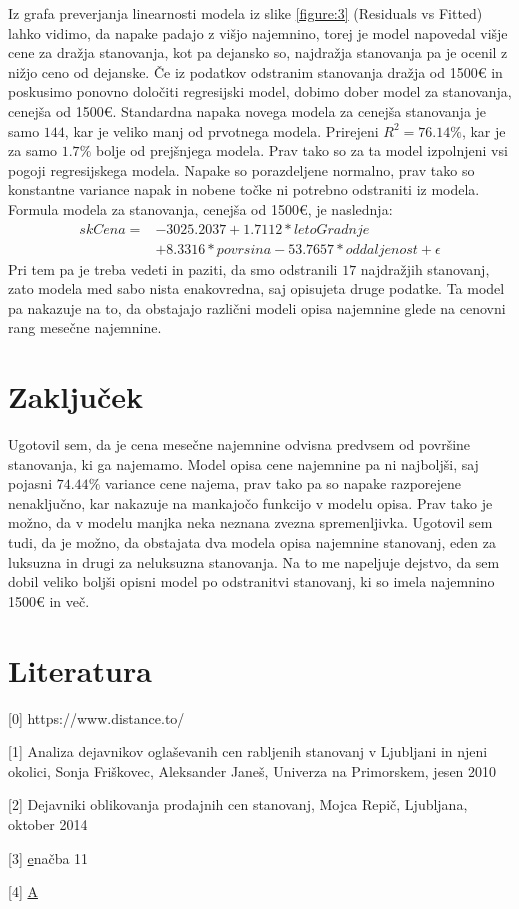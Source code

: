 \documentclass[a4paper, 12pt]{article}
\begin{document}
Iz grafa preverjanja linearnosti modela iz slike \ref{figure:3}
(Residuals vs Fitted) lahko vidimo, da napake padajo z višjo najemnino, torej
je model napovedal višje cene za dražja stanovanja, kot pa dejansko so,
najdražja stanovanja pa je ocenil z nižjo ceno od dejanske. Če iz podatkov
odstranim stanovanja dražja od 1500€ in poskusimo ponovno določiti regresijski
model, dobimo dober model za stanovanja, cenejša od 1500€. Standardna napaka
novega modela za cenejša stanovanja je samo $ 144 $, kar je veliko manj od
prvotnega modela. Prirejeni $ R^{2} = 76.14\% $, kar je za samo $ 1.7\% $ bolje
od prejšnjega modela. Prav tako so za ta model izpolnjeni vsi pogoji
regresijskega modela. Napake so porazdeljene normalno, prav tako so konstantne
variance napak in nobene točke ni potrebno odstraniti iz modela. Formula modela
za stanovanja, cenejša od 1500€, je naslednja:
\begin{equation}
\begin{split}
	skCena = &-3025.2037+1.7112*letoGradnje \\
			&+8.3316*povrsina-53.7657*oddaljenost+\epsilon
\end{split}
\end{equation}
Pri tem pa je treba vedeti in paziti, da smo odstranili $ 17 $ najdražjih
stanovanj, zato modela med sabo nista enakovredna, saj opisujeta druge
podatke. Ta model pa nakazuje na to, da obstajajo različni modeli opisa
najemnine glede na cenovni rang mesečne najemnine.

\section{Zaključek}

Ugotovil sem, da je cena mesečne najemnine odvisna predvsem od površine
stanovanja, ki ga najemamo. Model opisa cene najemnine pa ni najboljši, saj
pojasni $ 74.44\% $ variance cene najema, prav tako pa so napake razporejene
nenaključno, kar nakazuje na mankajočo funkcijo v modelu opisa. Prav tako je
možno, da v modelu manjka neka neznana zvezna spremenljivka. Ugotovil sem tudi,
da je možno, da obstajata dva modela opisa najemnine stanovanj, eden za
luksuzna in drugi za neluksuzna stanovanja. Na to me napeljuje dejstvo, da sem
dobil veliko boljši opisni model po odstranitvi stanovanj, ki so imela
najemnino 1500€ in več.

\section{Literatura}

[0]
https://www.distance.to/

[1] Analiza dejavnikov oglaševanih cen rabljenih stanovanj v Ljubljani in njeni
okolici, Sonja Friškovec, Aleksander Janeš, Univerza na Primorskem, jesen 2010

[2] Dejavniki oblikovanja prodajnih cen stanovanj, Mojca Repič, Ljubljana,
oktober 2014

[3] \href{https://www.researchgate.net/publication/239329925_A_New_Test_of_Symmetry_about_an_Unknown_Median}
enačba 11

[4] \href{https://gitlab.com/ul-fri/ovs/projekt/-/blob/master/regresija.pdf}{A}
\end{document}
